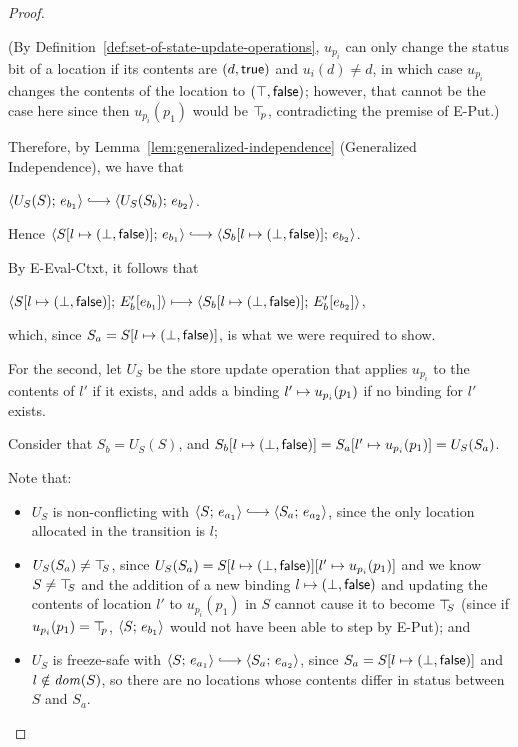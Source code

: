 \begin{proof}
\begin{enumerate}
\begin{enumerate}
\begin{itemize}
        (By Definition~\ref{def:set-of-state-update-operations},
        $u_{p_i}$ can only change the status bit of a location if its
        contents are $(d, \textsf{true})$ and $u_i(d) \neq d$, in
        which case $u_{p_i}$ changes the contents of the location to
        $(\top, \textsf{false})$; however, that cannot be the case
        here since then $u_{p_i}(p_1)$ would be $\top\hspace{-0.85mm}_{p}$, contradicting
        the premise of {\sc E-Put}.)
      \end{itemize}

      Therefore, by Lemma~\ref{lem:generalized-independence}
      (Generalized Independence), we have that

      $\config{U_S(S)}{e_{b_1}} \parstepsto
      \config{U_S(S_b)}{e_{b_2}}$.

      Hence $\config{\extS{S}{l}{\bot}{\frozenfalse}}{e_{b_1}}
      \parstepsto
      \config{\extS{S_b}{l}{\bot}{\frozenfalse}}{e_{b_2}}$.

      By {\sc E-Eval-Ctxt}, it follows that

      $\langle S[l \mapsto (\bot, \textsf{false})];\, E'_b\hspace{-0.5mm}\left[e_{b_1}\right] \rangle
      \longmapsto
      \langle S_b[l \mapsto (\bot, \textsf{false})];\, E'_b\hspace{-0.5mm}\left[e_{b_2}\right] \rangle$,
      
      which, since $S_a = S[l \mapsto (\bot, \textsf{false})]$, is what we
      were required to show.

      For the second, let $U_S$ be the store update operation that
      applies $u_{p_i}$ to the contents of $l'$ if it exists, and adds
      a binding $l' \mapsto u_{p_i}(p_1)$ if no binding for
      $l'$ exists.

      Consider that $S_b = U_S(S)$, and
      $S_b[l \mapsto (\bot, \textsf{false})] =
      S_a[l' \mapsto u_{p_i}(p_1)] = U_S(S_a)$.

      Note that:
      \begin{itemize}
      \item $U_S$ is non-conflicting with $\config{S}{e_{a_1}}
        \parstepsto \config{S_a}{e_{a_2}}$, since the only location
        allocated in the transition is $l$;
      \item $U_S(S_a) \neq \top\hspace{-0.85mm}_{S}$, since $U_S(S_a) =
        S[l \mapsto (\bot, \textsf{false})][l' \mapsto u_{p_i}(p_1)]$
        and we know $S \neq \top\hspace{-0.85mm}_{S}$ and the addition of a new binding
        $l \mapsto (\bot, \textsf{false})$ and updating the
        contents of location $l'$ to $u_{p_i}(p_1)$ in $S$ cannot
        cause it to become $\top\hspace{-0.85mm}_{S}$ (since if $u_{p_i}(p_1) = \top\hspace{-0.85mm}_{p}$,
        $\langle S;\, e_{b_1} \rangle$ would not have been able to step by {\sc
          E-Put}); and
      \item $U_S$ is freeze-safe with $\config{S}{e_{a_1}} \parstepsto
        \config{S_a}{e_{a_2}}$, since $S_a =
        S[l \mapsto (\bot, \textsf{false})]$ and $l \notin \mathit{dom}(S)$, so
        there are no locations whose contents differ in status between
        $S$ and $S_a$.
      \end{itemize}


\end{enumerate}
\end{enumerate}
\end{proof}
